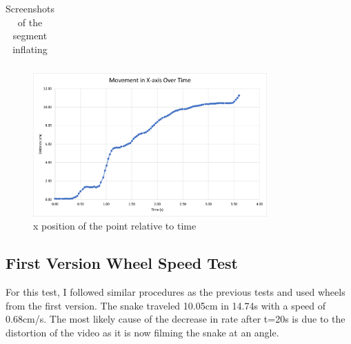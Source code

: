 \documentclass[twoside, 11pt]{article}
\begin{document}
\begin{table} [H]
\begin{tabular}{|c|c|c|c|}
	\hline
	\end{tabular}
	\caption{Screenshots of the segment inflating}
\end{table}
\begin{figure} [H]
\centering
\includegraphics[width=0.8\textwidth]{two seg}
\caption{x position of the point relative to time}
\end{figure}

\subsection{First Version Wheel Speed Test}

For this test, I followed similar procedures as the previous tests and used wheels from the first version. The snake traveled 10.05cm in 14.74s with a speed of 0.68cm/s. The most likely cause of the decrease in rate after t=20s is due to the distortion of the video as it is now filming the snake at an angle. 
\end{document}
